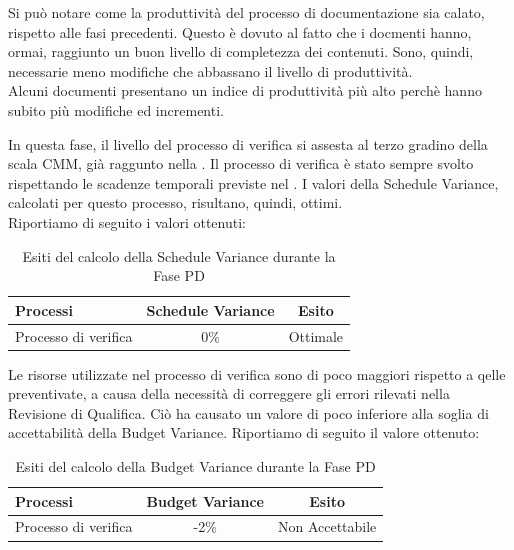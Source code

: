 			Si può notare come la produttività del processo di documentazione sia calato, rispetto alle fasi precedenti. Questo è dovuto al fatto che i docmenti hanno, ormai, raggiunto un buon livello di completezza dei contenuti. Sono, quindi, necessarie meno modifiche che abbassano il livello di produttività. \\
			Alcuni documenti presentano un indice di produttività più alto perchè hanno subito più modifiche ed incrementi.

			In questa fase, il livello del processo di verifica si assesta al terzo gradino della scala CMM, già raggunto nella .
			Il processo di verifica è stato sempre svolto rispettando le scadenze temporali previste nel . I valori della Schedule Variance, calcolati per questo processo, risultano, quindi, ottimi.\\
			Riportiamo di seguito i valori ottenuti:
			\begin{table}[H]
				\centering
				\begin{tabu}{| l | c | c |}
					\hline
						Processi 			& Schedule Variance	& Esito		\\ \hline \hline
						Processo di verifica & 0\% & Ottimale \\ \hline
				\end{tabu}
				\caption{Esiti del calcolo della Schedule Variance durante la Fase PD}
			\end{table}	

			Le risorse utilizzate nel processo di verifica sono di poco maggiori rispetto a qelle preventivate, a causa della necessità di correggere gli errori rilevati nella Revisione di Qualifica. Ciò ha causato un valore di poco inferiore alla soglia di accettabilità della Budget Variance.
			Riportiamo di seguito il valore ottenuto:
			\begin{table}[H]
				\centering
				\begin{tabu}{| l | c | c |}
				\hline
				Processi 			& Budget Variance	& Esito		\\ \hline \hline
				Processo di verifica & -2\% & Non Accettabile \\ \hline
				\end{tabu}
				\caption{Esiti del calcolo della Budget Variance durante la Fase PD}
			\end{table}	

